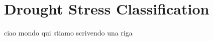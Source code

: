 \section{Drought Stress Classification}
ciao mondo qui stiamo scrivendo una riga
































